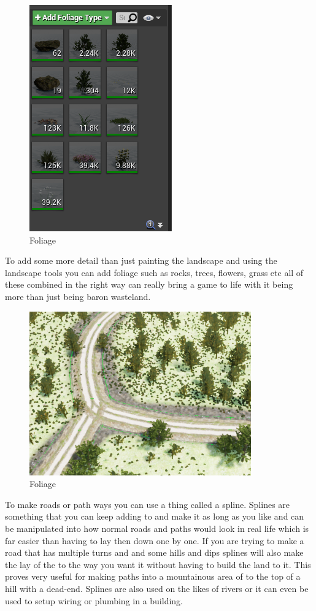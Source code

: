 \begin{figure}[H]
    \centering
    \includegraphics[scale=.7]{img/Foliage.PNG}
    \caption{Foliage}
    \label{Level Design}
\end{figure}
To add some more detail than just painting the landscape and using the landscape tools you can add foliage such as rocks, trees, flowers, grass etc all of these combined in the right way can really bring a game to life with it being more than just being baron wasteland.
\begin{figure}[H]
    \centering
    \includegraphics[scale=.5]{img/Spline.PNG}
    \caption{Foliage}
    \label{Spline}
\end{figure}
To make roads or path ways you can use a thing called a spline. Splines are something that you can keep adding to and make it as long as you like and can be manipulated into how normal roads and paths would look in real life which is far easier than having to lay then down one by one. If you are trying to make a road that has multiple turns and and some hills and dips splines will also make the lay of the to the way you want it without having to build the land to it. This proves very useful for making paths into a mountainous area of to the top of a hill with a dead-end. Splines are also used on the likes of rivers or it can even be used to setup wiring or plumbing in a building.
